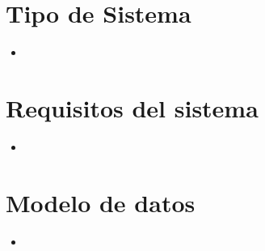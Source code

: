 \documentclass{article}
\begin{document}
	
	\vspace*{10px}
	
	\section{Tipo de Sistema}
		\begin{itemize}		
			\item 
		\end{itemize}
			
	\section{Requisitos del sistema}
		\begin{itemize}
			\item 
		\end{itemize}
		
	\section{Modelo de datos}
		\begin{itemize}
			\item 
		\end{itemize}
		
\end{document}

